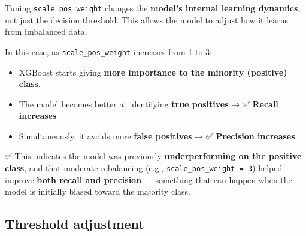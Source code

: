 \documentclass[
  letterpaper,
  DIV=11,
  numbers=noendperiod]{scrreprt}
\providecommand{\tightlist}{%
  \setlength{\itemsep}{0pt}\setlength{\parskip}{0pt}}\usepackage{longtable,booktabs,array}
\begin{document}
Tuning \texttt{scale\_pos\_weight} changes the \textbf{model's internal
learning dynamics}, not just the decision threshold. This allows the
model to adjust how it learns from imbalanced data.

In this case, as \texttt{scale\_pos\_weight} increases from 1 to 3:

\begin{itemize}
\tightlist
\item
  XGBoost starts giving \textbf{more importance to the minority
  (positive) class}.
\item
  The model becomes better at identifying \textbf{true positives} → ✅
  \textbf{Recall increases}
\item
  Simultaneously, it avoids more \textbf{false positives} → ✅
  \textbf{Precision increases}
\end{itemize}

✅ This indicates the model was previously \textbf{underperforming on
the positive class}, and that moderate rebalancing (e.g.,
\texttt{scale\_pos\_weight\ =\ 3}) helped improve \textbf{both recall
and precision} --- something that can happen when the model is initially
biased toward the majority class.

\subsection{Threshold adjustment}\label{threshold-adjustment}
\end{document}
